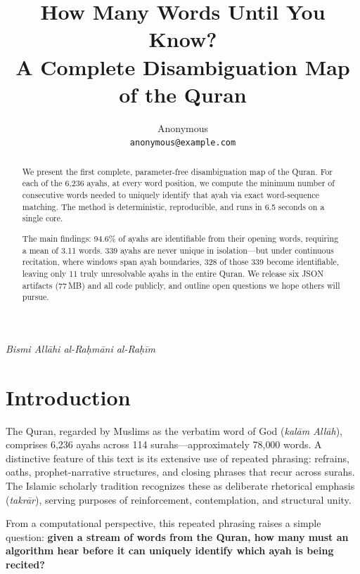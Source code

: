 \documentclass[11pt,a4paper]{article}
\title{How Many Words Until You Know?\\A Complete Disambiguation Map of the Quran}
\author{
  Anonymous \\
  \texttt{anonymous@example.com}
}
\begin{document}
\maketitle

\begin{center}
\textit{Bismi All\=ahi al-Ra\d{h}m\=ani al-Ra\d{h}\=im}
\end{center}

\begin{abstract}
We present the first complete, parameter-free disambiguation map of the Quran.
For each of the 6{,}236 ayahs, at every word position, we compute the minimum number of consecutive words needed to uniquely identify that ayah via exact word-sequence matching.
The method is deterministic, reproducible, and runs in 6.5 seconds on a single core.

The main findings: 94.6\% of ayahs are identifiable from their opening words, requiring a mean of 3.11 words.
339 ayahs are never unique in isolation---but under continuous recitation, where windows span ayah boundaries, 328 of those 339 become identifiable, leaving only 11 truly unresolvable ayahs in the entire Quran.
We release six JSON artifacts (77\,MB) and all code publicly, and outline open questions we hope others will pursue.
\end{abstract}

\section{Introduction}
\label{sec:intro}

The Quran, regarded by Muslims as the verbatim word of God (\emph{kal\=am All\=ah}), comprises 6{,}236 ayahs across 114 surahs---approximately 78{,}000 words.
A distinctive feature of this text is its extensive use of repeated phrasing: refrains, oaths, prophet-narrative structures, and closing phrases that recur across surahs.
The Islamic scholarly tradition recognizes these as deliberate rhetorical emphasis (\emph{takr\=ar}), serving purposes of reinforcement, contemplation, and structural unity.

From a computational perspective, this repeated phrasing raises a simple question: \textbf{given a stream of words from the Quran, how many must an algorithm hear before it can uniquely identify which ayah is being recited?}
\end{document}
